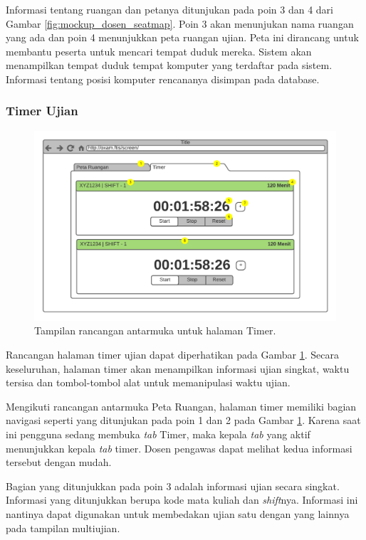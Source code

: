     Informasi tentang ruangan dan petanya ditunjukan pada poin 3 dan 4 dari Gambar 
    \ref{fig:mockup_dosen_seatmap}. Poin 3 akan menunjukan nama ruangan yang ada dan poin
    4 menunjukkan peta ruangan ujian. Peta ini dirancang untuk membantu peserta untuk mencari
    tempat duduk mereka. Sistem akan menampilkan tempat duduk tempat komputer yang terdaftar
    pada sistem. Informasi tentang posisi komputer rencananya disimpan pada database.
    
\subsubsection{Timer Ujian}
    \begin{figure}
        \centering
        \includegraphics[width=0.7\paperwidth]{Gambar/mockups/Mockup--DosenPengawas - Timer.pdf}
        \caption{Tampilan rancangan antarmuka untuk halaman Timer.}
        \label{fig:mockup_dosen_timer}
    \end{figure}
    Rancangan halaman timer ujian dapat diperhatikan pada Gambar \ref{fig:mockup_dosen_timer}.
    Secara keseluruhan, halaman timer akan menampilkan informasi ujian singkat, waktu tersisa
    dan tombol-tombol alat untuk memanipulasi waktu ujian.
    
    Mengikuti rancangan antarmuka Peta Ruangan, halaman timer memiliki bagian navigasi seperti
    yang ditunjukan pada poin 1 dan 2 pada Gambar \ref{fig:mockup_dosen_timer}. Karena saat ini
    pengguna sedang membuka \textit{tab} Timer, maka kepala \textit{tab} yang aktif menunjukkan
    kepala \textit{tab} timer. Dosen pengawas dapat melihat kedua informasi tersebut dengan mudah.
    
    Bagian yang ditunjukkan pada poin 3 adalah informasi ujian secara singkat. Informasi yang ditunjukkan
    berupa kode mata kuliah dan \textit{shift}nya. Informasi ini nantinya dapat digunakan untuk membedakan
    ujian satu dengan yang lainnya pada tampilan multiujian.
    
